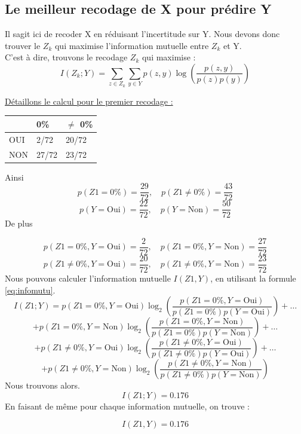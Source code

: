 \documentclass{article}
\begin{document}
\subsection{Le meilleur recodage de X pour prédire Y }

Il sagit ici de recoder X en réduisant l'incertitude sur Y.
Nous devons donc trouver le $Z_k$ qui maximise l'information mutuelle entre $Z_k$ et Y.
\\
C'est à dire, trouvons le recodage $Z_k$ qui maximise :
\begin{equation}
  I(Z_k; Y) = \sum_{z\in Z_k} \sum_{y \in Y} p(z, y) \log \left( \frac{p(z, y)}{p(z)p(y)} \right)
  \label{eq:infomutu}
\end{equation}

\underline{Détaillons le calcul pour le premier recodage :}

\begin{table}[H]
  \centering
  \begin{tabular}{|l|l|l|}
  \hline
      & 0\%   & $\neq$ 0\% \\ \hline
  OUI & 2/72  & 20/72 \\ \hline
  NON & 27/72 & 23/72 \\ \hline
  \end{tabular}
  \end{table}
Ainsi
\[
p(Z1 = 0\%) = \frac{29}{72}, \quad p(Z1 \neq 0\%) = \frac{43}{72}
\]
\[
p(Y = \text{Oui}) = \frac{22}{72}, \quad p(Y = \text{Non}) = \frac{50}{72}
\]
De plus

\[
p(Z1 = 0\%, Y = \text{Oui}) = \frac{2}{72}, \quad p(Z1 = 0\%, Y = \text{Non}) = \frac{27}{72}
\]
\[
p(Z1 \neq 0\%, Y = \text{Oui}) = \frac{20}{72}, \quad p(Z1 \neq 0\%, Y = \text{Non}) = \frac{23}{72}
\]
Nous pouvons calculer l'information mutuelle $I(Z1,Y)$, en utilisant la formule \ref{eq:infomutu}.
\[
I(Z1; Y) = p(Z1 = 0\%, Y = \text{Oui}) \log_2 \left(\frac{p(Z1 = 0\%, Y = \text{Oui})}{p(Z1 = 0\%) p(Y = \text{Oui})}\right) + \ldots
\]
\[
+ p(Z1 = 0\%, Y = \text{Non}) \log_2 \left(\frac{p(Z1 = 0\%, Y = \text{Non})}{p(Z1 = 0\%) p(Y = \text{Non})}\right) + \ldots
\]
\[
+ p(Z1 \neq 0\%, Y = \text{Oui}) \log_2 \left(\frac{p(Z1 \neq 0\%, Y = \text{Oui})}{p(Z1 \neq 0\%) p(Y = \text{Oui})}\right) + \ldots
\]
\[
+ p(Z1 \neq 0\%, Y = \text{Non}) \log_2 \left(\frac{p(Z1 \neq 0\%, Y = \text{Non})}{p(Z1 \neq 0\%) p(Y = \text{Non})}\right)
\]
Nous trouvons alors.
\[
  I(Z1; Y)= 0.176
\]
En faisant de même pour chaque information mutuelle, on trouve : 

\[
I(Z1,Y) = 0.176
\]
\end{document}
